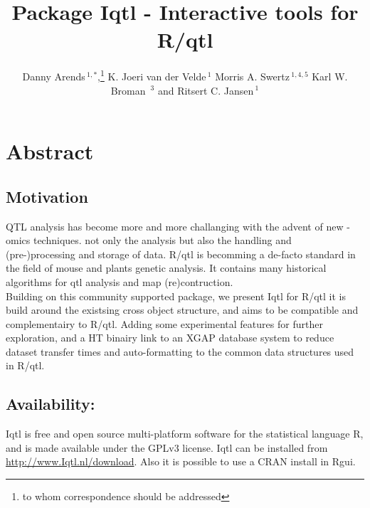 \documentclass{bioinfo}
\begin{document}
\title[XGAP cluster]{Package Iqtl - Interactive tools for R/qtl}
\author[Arends \textit{et~al}]{
Danny Arends\,$^{1,*}$,\footnote{to whom correspondence should be addressed}
K. Joeri van der Velde\,$^{1}$
Morris A. Swertz\,$^{1,4,5}$
Karl W. Broman\, $^{3}$ and
Ritsert C. Jansen\,$^1$
}
\address{$^{1}$Groningen Bioinformatics Centre, University of Groningen, NL.
$^{2}$Department of Nematology, Wageningen University, NL.
$^{3}$Department of Biostatistics \& Medical Informatics, University of Wisconsin-Madison, US.
$^{4}$Genomics Coordination Centre, University Medical Center Groningen \& University of Groningen, NL.
$^{5}$European Bioinformatics Institute, Hinxton, UK.
}
\maketitle

\section*{Abstract}
\subsection*{Motivation}

QTL analysis has become more and more challanging with the advent of new -omics techniques. 
not only the analysis but also the handling and (pre-)processing and storage of data. R/qtl is 
becomming a de-facto standard in the field of mouse and plants genetic analysis. It contains 
many historical algorithms for qtl analysis and map (re)contruction.\\
Building on this community supported package, we present Iqtl for R/qtl it is build around the 
existsing cross object structure, and aims to be compatible and complementairy to R/qtl. Adding 
some experimental features for further exploration, and a HT binairy link to an XGAP database system
to reduce dataset transfer times and auto-formatting to the common data structures used in R/qtl.

\subsection*{Availability:}

Iqtl is free and open source multi-platform software for the
statistical language R, and is made available under the GPLv3 
license. Iqtl can be installed from \href{http://www.Iqtl.nl/download}{http://www.Iqtl.nl/download}.
Also it is possible to use a CRAN install in Rgui.
\end{document}
